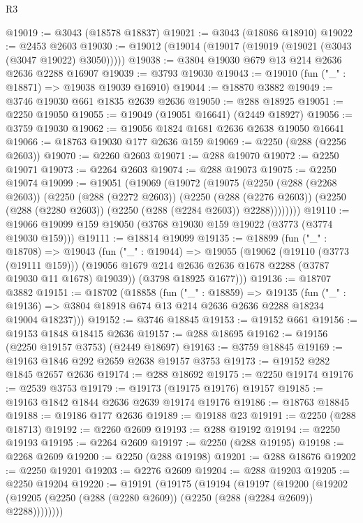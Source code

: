 \begin{lexlean}{R3}
\begin{coremodule}
@19019 := @3043 (@18578 @18837)
@19021 := @3043 (@18086 @18910)
@19022 := @2453 @2603
@19030 := @19012 (@19014 (@19017 (@19019 (@19021 (@3043 (@3047 @19022) @3050)))))
@19038 := @3804 @19030 @679 @13 @214 @2636 @2636 @2288 @16907
@19039 := @3793 @19030
@19043 := @19010 (fun ("_" : @18871) => @19038 @19039 @16910)
@19044 := @18870 @3882
@19049 := @3746 @19030 @661 @1835 @2639 @2636
@19050 := @288 @18925
@19051 := @2250 @19050
@19055 := @19049 (@19051 @16641) (@2449 @18927)
@19056 := @3759 @19030
@19062 := @19056 @1824 @1681 @2636 @2638 @19050 @16641
@19066 := @18763 @19030 @177 @2636 @159
@19069 := @2250 (@288 (@2256 @2603))
@19070 := @2260 @2603
@19071 := @288 @19070
@19072 := @2250 @19071
@19073 := @2264 @2603
@19074 := @288 @19073
@19075 := @2250 @19074
@19099 := @19051
    (@19069
      (@19072
        (@19075
          (@2250
            (@288 (@2268 @2603))
            (@2250
              (@288 (@2272 @2603))
              (@2250
                (@288 (@2276 @2603))
                (@2250 (@288 (@2280 @2603)) (@2250 (@288 (@2284 @2603)) @2288))))))))
@19110 := @19066 @19099 @159 @19050 (@3768 @19030 @159 @19022 (@3773 (@3774 @19030 @159)))
@19111 := @18814 @19099
@19135 := @18899
    (fun ("_" : @18708) =>
    @19043
      (fun ("_" : @19044) =>
      @19055
        (@19062
          (@19110 (@3773 (@19111 @159)))
          (@19056 @1679 @214 @2636 @2636 @1678 @2288 (@3787 @19030 @11 @1678) @19039))
        (@3798 @18925 @1677)))
@19136 := @18707 @3882
@19151 := @18702
    (@18858
      (fun ("_" : @18859) =>
      @19135
        (fun ("_" : @19136) => @3804 @18918 @674 @13 @214 @2636 @2636 @2288 @18234 @19004 @18237)))
@19152 := @3746 @18845
@19153 := @19152 @661
@19156 := @19153 @1848 @18415 @2636
@19157 := @288 @18695
@19162 := @19156 (@2250 @19157 @3753) (@2449 @18697)
@19163 := @3759 @18845
@19169 := @19163 @1846 @292 @2659 @2638 @19157 @3753
@19173 := @19152 @282 @1845 @2657 @2636
@19174 := @288 @18692
@19175 := @2250 @19174
@19176 := @2539 @3753
@19179 := @19173 (@19175 @19176) @19157
@19185 := @19163 @1842 @1844 @2636 @2639 @19174 @19176
@19186 := @18763 @18845
@19188 := @19186 @177 @2636
@19189 := @19188 @23
@19191 := @2250 (@288 @18713)
@19192 := @2260 @2609
@19193 := @288 @19192
@19194 := @2250 @19193
@19195 := @2264 @2609
@19197 := @2250 (@288 @19195)
@19198 := @2268 @2609
@19200 := @2250 (@288 @19198)
@19201 := @288 @18676
@19202 := @2250 @19201
@19203 := @2276 @2609
@19204 := @288 @19203
@19205 := @2250 @19204
@19220 := @19191
    (@19175
      (@19194
        (@19197
          (@19200
            (@19202 (@19205 (@2250 (@288 (@2280 @2609)) (@2250 (@288 (@2284 @2609)) @2288))))))))

\end{coremodule}
\end{lexlean}

